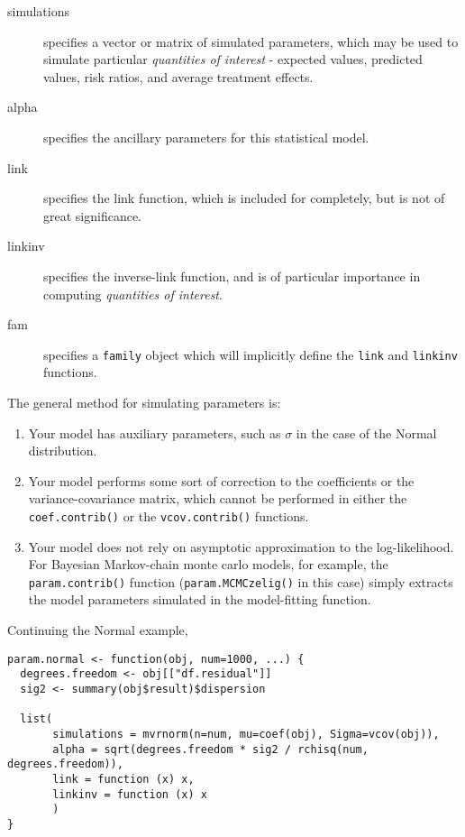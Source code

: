 \begin{description}
	\item[simulations] specifies a vector or matrix of simulated parameters, which may be used to simulate particular \emph{quantities of interest} - expected values, predicted values, risk ratios, and average treatment effects.
	
	\item[alpha] specifies the ancillary parameters for this statistical model.
	
	\item[link] specifies the link function, which is included for completely, but is not of great significance.
	
	\item[linkinv] specifies the inverse-link function, and is of particular importance in computing \emph{quantities of interest}.
	
	\item[fam] specifies a {\tt family} object which will implicitly define the {\tt link} and {\tt linkinv} functions.
\end{description}


The general method for simulating parameters is:

\begin{enumerate}

  \item Your model has auxiliary parameters, such as $\sigma$ in the case of the Normal distribution.

  \item Your model performs some sort of correction to the coefficients or the variance-covariance matrix, which cannot be performed in either the {\tt coef.contrib()} or the {\tt vcov.contrib()} functions.

  \item Your model does not rely on asymptotic approximation to the log-likelihood.  For Bayesian Markov-chain monte carlo models, for example, the {\tt param.contrib()} function ({\tt param.MCMCzelig()} in this case) simply extracts the model parameters simulated in the model-fitting function.

\end{enumerate}

Continuing the Normal example, 

\begin{verbatim}
param.normal <- function(obj, num=1000, ...) {
  degrees.freedom <- obj[["df.residual"]]
  sig2 <- summary(obj$result)$dispersion

  list(
       simulations = mvrnorm(n=num, mu=coef(obj), Sigma=vcov(obj)),
       alpha = sqrt(degrees.freedom * sig2 / rchisq(num, degrees.freedom)),
       link = function (x) x,
       linkinv = function (x) x
       )
}

\end{verbatim}



